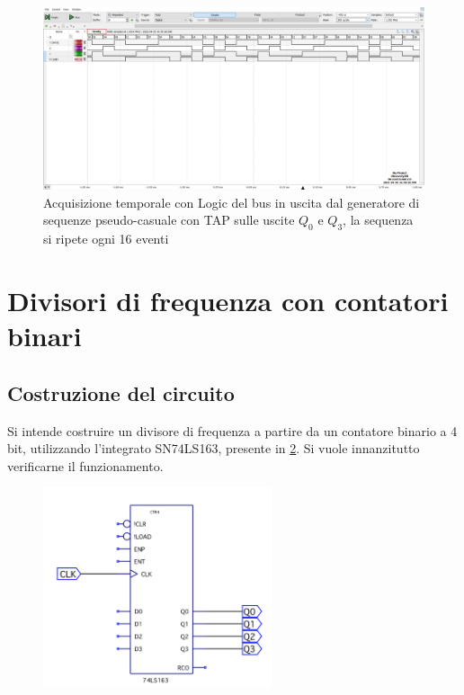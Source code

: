 \documentclass[10pt, a4paper, italian]{article}
\begin{document}
\begin{figure}[htbp]
\centering
	\includegraphics[width=\textwidth]{4.b_30}
	\caption{Acquisizione temporale con Logic del bus in uscita dal generatore di sequenze pseudo-casuale con TAP sulle uscite $Q_0$ e $Q_3$, la sequenza si ripete ogni 16 eventi \label{fig: TAP_30}}
\end{figure}

\section{Divisori di frequenza con contatori binari}
\subsection{Costruzione del circuito}
Si intende costruire un divisore di frequenza a partire da un contatore binario a 4 bit, utilizzando l'integrato SN74LS163, presente in \cref{fig: schem_counter}. Si vuole innanzitutto verificarne il funzionamento. 
\begin{figure}[htbp]
\centering
	\includegraphics[width=0.6\textwidth]{schem_con}
	\caption{\label{fig: schem_counter}}
\end{figure}
\end{document}
